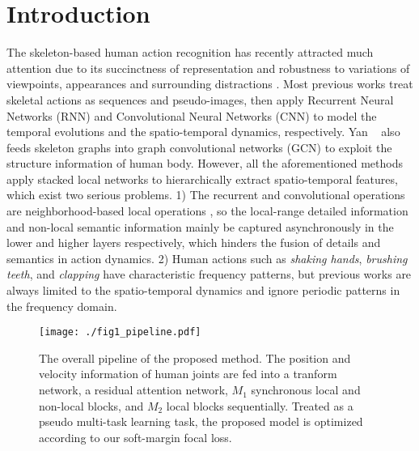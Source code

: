 \documentclass{article}
\begin{document}
\section{Introduction}
\label{sec:intro}
The skeleton-based human action recognition has recently attracted much attention due to its succinctness of representation and robustness to variations of viewpoints, appearances and surrounding distractions \cite{DBLP:conf/iccv/ZhangLXZXZ17}. Most previous works treat skeletal actions as sequences and pseudo-images, then apply Recurrent Neural Networks (RNN) \cite{DBLP:conf/iccv/ZhangLXZXZ17,DBLP:conf/cvpr/ShahroudyLNW16,DBLP:conf/eccv/LiuSXW16} and Convolutional Neural Networks (CNN) \cite{DBLP:conf/cvpr/KeBASB17,DBLP:conf/ijcai/LiZXP18} to model the temporal evolutions and the spatio-temporal dynamics, respectively. Yan \etal~\cite{DBLP:conf/aaai/YanXL18} also feeds skeleton graphs into graph convolutional networks (GCN) to exploit the structure information of human body. However, all the aforementioned methods apply stacked local networks to hierarchically extract spatio-temporal features, which exist two serious problems. 1) The recurrent and convolutional operations are neighborhood-based local operations \cite{DBLP:journals/corr/abs-1711-07971}, so the local-range detailed information and non-local semantic information mainly be captured asynchronously in the lower and higher layers respectively, which hinders the fusion of details and semantics in action dynamics. 2) Human actions such as \textit{shaking hands}, \textit{brushing teeth}, and \textit{clapping} have characteristic frequency patterns, but previous works are always limited to the spatio-temporal dynamics and ignore periodic patterns in the frequency domain.

\begin{figure*}[tbp]
	\centering
	\texttt{[image: ./fig1\_pipeline.pdf]}
	\caption{The overall pipeline of the proposed method. The position and velocity information of human joints are fed into a tranform network, a residual attention network, $ M_1 $ synchronous local and non-local blocks, and $ M_2 $ local blocks sequentially. Treated as a pseudo multi-task learning task, the proposed model is optimized according to our soft-margin focal loss.}
	\label{fig_pipline}
\end{figure*}
\end{document}
